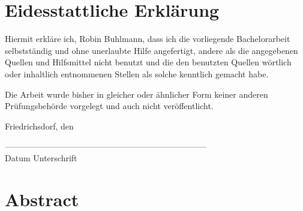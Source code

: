 \newpage
\chapter*{Eidesstattliche Erklärung}

Hiermit erkläre ich, Robin Buhlmann, dass ich die vorliegende Bachelorarbeit selbstständig und ohne unerlaubte Hilfe angefertigt, andere als die angegebenen Quellen und Hilfsmittel nicht benutzt und die den benutzten Quellen wörtlich oder inhaltlich entnommenen Stellen als solche kenntlich gemacht habe.

Die Arbeit wurde bisher in gleicher oder ähnlicher Form keiner anderen Prüfungsbehörde vorgelegt und auch nicht veröffentlicht.


\vspace{1cm}

Friedrichsdorf, den

\vspace{1cm}

------------------------------------\hspace{6cm}------------------------------------\\
Datum \hspace{9,4cm} Unterschrift

\newpage

\chapter*{Abstract}











